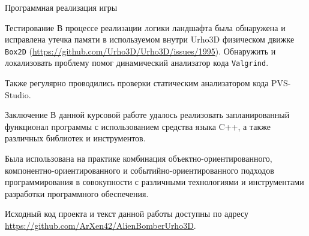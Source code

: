 \begin{section}{Программная реализация игры}
\begin{subsection}{Тестирование}
			В процессе реализации логики ландшафта была обнаружена и исправлена утечка памяти в используемом внутри Urho3D физическом движке \verb|Box2D| (\url{https://github.com/Urho3D/Urho3D/issues/1995}).
			Обнаружить и локализовать проблему помог динамический анализатор кода \verb|Valgrind|.

			Также регулярно проводились проверки статическим анализатором кода PVS-Studio.
		\end{subsection}

	\end{section}

	\begin{section}{Заключение}
		В данной курсовой работе удалось реализовать запланированный функционал программы с использованием средства языка C++, а также различных библиотек и инструментов.

		Была использована на практике комбинация объектно-ориентированного, компонентно-ориентированного и событийно-ориентированного подходов программирования в совокупности с различными технологиями и инструментами разработки программного обеспечения.

		Исходный код проекта и текст данной работы доступны по адресу \url{https://github.com/ArXen42/AlienBomberUrho3D}.
	\end{section}

	~\nocite{urho3d-docs,cppreference, teplyakov}
	\printbibliography[title = Список использованных источников]


